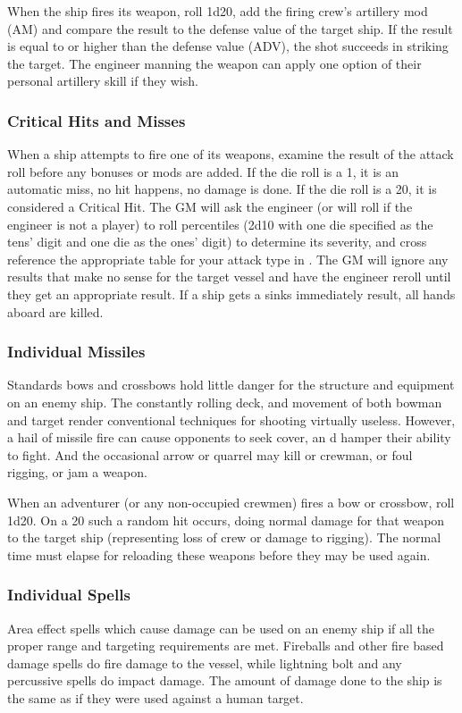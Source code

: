 When the ship fires its weapon, roll 1d20, add the firing crew's artillery mod (AM) and compare the result to the defense value of the target ship. If the result is equal to or higher than the defense value (ADV), the shot succeeds in striking the target. The engineer manning the weapon can apply one option of their personal artillery skill if they wish.

\subsubsection{Critical Hits and Misses}
When a ship attempts to fire one of its weapons, examine the result of the attack roll before any bonuses or mods are added. If the die roll is a 1, it is an automatic miss, no hit happens, no damage is done. If the die roll is a 20, it is considered a Critical Hit. The GM will ask the engineer (or will roll if the engineer is not a player) to roll percentiles (2d10 with one die specified as the tens' digit and one die as the ones' digit) to determine its severity, and cross reference the appropriate table for your attack type in . The GM  will ignore any results that make no sense for the target vessel and have the engineer reroll until they get an appropriate result. If a ship gets a sinks immediately result, all hands aboard are killed.
\subsubsection{Individual Missiles}
Standards bows and crossbows hold little danger
for the structure and equipment on an enemy ship. The constantly rolling deck, and movement of both bowman and target render conventional techniques for shooting virtually useless. However, a hail of missile fire can cause opponents to seek cover, an d hamper their ability to fight. And the occasional arrow or quarrel may kill or crewman, or foul rigging, or jam a weapon.

When an adventurer (or any non-occupied crewmen) fires a bow or crossbow, roll 1d20. On a 20 such a random hit occurs, doing normal damage for that weapon to the target ship (representing loss of crew or damage to rigging). The normal time must elapse for reloading these weapons before they may be used again.
\subsubsection{Individual Spells}
Area effect spells which cause damage can be used on an enemy ship if all the proper range and targeting requirements are met. Fireballs and other fire based damage spells do fire damage to the vessel, while lightning bolt and any percussive spells do impact damage. The amount of damage done to the ship is the same as if they were used against a human target.
